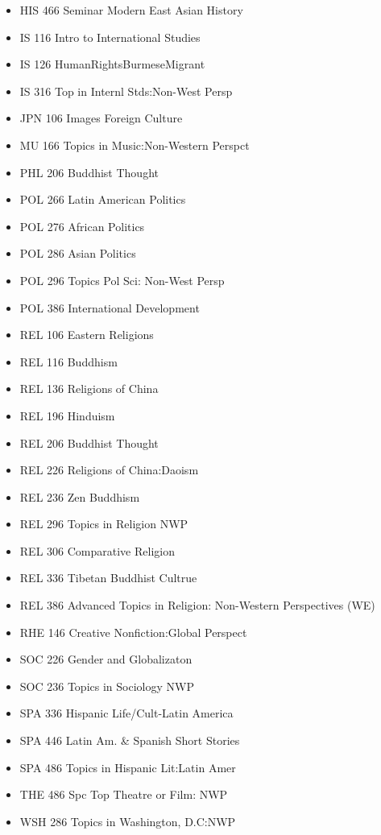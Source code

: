 \documentclass[
  letterpaper,
]{scrbook}
\begin{document}
\begin{itemize}
\item
  HIS 466 Seminar Modern East Asian History
\item
  IS 116 Intro to International Studies
\item
  IS 126 HumanRightsBurmeseMigrant
\item
  IS 316 Top in Internl Stds:Non-West Persp
\item
  JPN 106 Images Foreign Culture
\item
  MU 166 Topics in Music:Non-Western Perspct
\item
  PHL 206 Buddhist Thought
\item
  POL 266 Latin American Politics
\item
  POL 276 African Politics
\item
  POL 286 Asian Politics
\item
  POL 296 Topics Pol Sci: Non-West Persp
\item
  POL 386 International Development
\item
  REL 106 Eastern Religions
\item
  REL 116 Buddhism
\item
  REL 136 Religions of China
\item
  REL 196 Hinduism
\item
  REL 206 Buddhist Thought
\item
  REL 226 Religions of China:Daoism
\item
  REL 236 Zen Buddhism
\item
  REL 296 Topics in Religion NWP
\item
  REL 306 Comparative Religion
\item
  REL 336 Tibetan Buddhist Cultrue
\item
  REL 386 Advanced Topics in Religion: Non-Western Perspectives (WE)
\item
  RHE 146 Creative Nonfiction:Global Perspect
\item
  SOC 226 Gender and Globalizaton
\item
  SOC 236 Topics in Sociology NWP
\item
  SPA 336 Hispanic Life/Cult-Latin America
\item
  SPA 446 Latin Am. \& Spanish Short Stories
\item
  SPA 486 Topics in Hispanic Lit:Latin Amer
\item
  THE 486 Spc Top Theatre or Film: NWP
\item
  WSH 286 Topics in Washington, D.C:NWP
\end{itemize}
\end{document}
